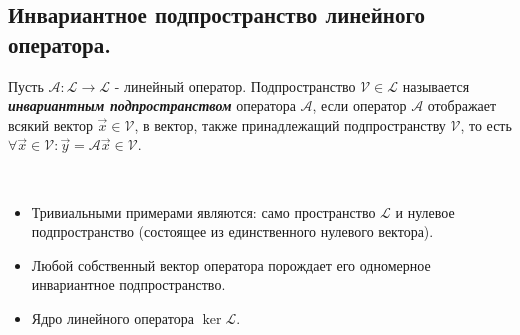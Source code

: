 \bigbreak

\begin{comment}
    Можно ли утверждать, что если $\mathscr{A} \colon \mathcal{V} \to \mathcal{V}$, то $\Im \mathscr{A} + \ker \mathscr{A} = \mathcal{V}$?

    \bigbreak

    \textbf{Ответ:} нельзя. 
    
    Например, $\mathscr{D} \colon p \longmapsto p'$.

    $p \in P_n(x)$

    $\Im \mathscr{D} = P_{n - 1}(x)$
    
    $\ker \mathscr{D} = P_0(x)$

    Но $P_0(x) + P_{n - 1}(x) \ne P_n(x)$.
    
\end{comment}


\newpage


\subsection{
    Инвариантное подпространство линейного оператора.
}

\begin{definition}
    Пусть $\mathscr{A} \colon \mathcal{L} \to \mathcal{L}$ - линейный оператор. Подпространство $\mathcal{V} \in \mathcal{L}$ называется \textbf{\textit{инвариантным подпространством}} оператора $\mathscr{A}$, если оператор $\mathscr{A}$ отображает всякий вектор $\vec{x} \in \mathcal{V}$, в вектор, также принадлежащий подпространству $\mathcal{V}$, то есть $\forall \vec{x} \in \mathcal{V} \colon \vec{y} = \mathscr{A}\vec{x} \in \mathcal{V}$.
\end{definition}

\begin{example}~

    \begin{itemize}
        \item Тривиальными примерами являются: само пространство $\mathcal{L}$ и нулевое подпространство (состоящее из единственного нулевого вектора).
        \item Любой собственный вектор оператора порождает его одномерное инвариантное подпространство.
        \item Ядро линейного оператора $\ker \mathcal{L}$. 
    \end{itemize}
\end{example}
